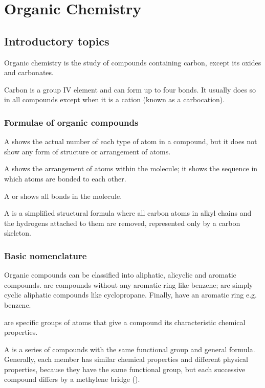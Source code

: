 \documentclass[Chemistry.tex]{subfiles}
\begin{document}
\chapter{Organic Chemistry}
\section{Introductory topics}
Organic chemistry is the study of compounds containing carbon, except its oxides and carbonates.

Carbon is a group IV element and can form up to four bonds. It usually does so in all compounds except when it is a cation (known as a carbocation).
\subsection{Formulae of organic compounds}
A  shows the actual number of each type of atom in a compound, but it does not show any form of structure or arrangement of atoms.

A  shows the arrangement of atoms within the molecule; it shows the sequence in which atoms are bonded to each other.

A  or  shows all bonds in the molecule.

A  is a simplified structural formula where all carbon atoms in alkyl chains and the hydrogens attached to them are removed, represented only by a carbon skeleton.
\subsection{Basic nomenclature}
Organic compounds can be classified into aliphatic, alicyclic and aromatic compounds.  are compounds without any aromatic ring like benzene;  are simply cyclic aliphatic compounds like cyclopropane. Finally,  have an aromatic ring e.g. benzene.

 are specific groups of atoms that give a compound its characteristic chemical properties.

A  is a series of compounds with the same functional group and general formula. Generally, each member has similar chemical properties and different physical properties, because they have the same functional group, but each successive compound differs by a methylene bridge ().
\end{document}
